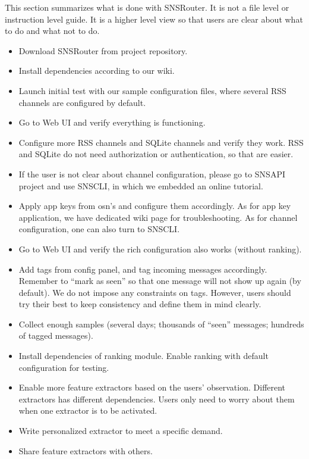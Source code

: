 \documentclass{sig-alternate}
\begin{document}
This section summarizes what is done with SNSRouter. 
It is not a file level or instruction level guide. 
It is a higher level view so that users are clear about 
what to do and what not to do. 

\begin{itemize}
	\item Download SNSRouter from project repository. 
	\item Install dependencies according to our wiki. 
	\item Launch initial test with our sample configuration files, 
		where several RSS channels are configured by default. 
	\item Go to Web UI and verify everything is functioning. 
	\item Configure more RSS channels and SQLite channels 
		and verify they work. 
		RSS and SQLite do not need authorization or authentication, 
		so that are easier. 
	\item If the user is not clear about channel configuration, 
		please go to SNSAPI project and use SNSCLI, 
		in which we embedded an online tutorial. 
	\item Apply app keys from \gls{osn}'s and configure them accordingly. 
		As for app key application, we have dedicated wiki page for troubleshooting. 
		As for channel configuration, one can also turn to SNSCLI. 
	\item Go to Web UI and verify the rich configuration also works
		(without ranking). 
	\item Add tags from config panel, and tag incoming messages accordingly. 
		Remember to ``mark as seen'' so that one message will not show up again (by default). 
		We do not impose any constraints on tags. 
		However, users should try their best to keep consistency 
		and define them in mind clearly. 
	\item Collect enough samples 
		(several days; thousands of ``seen'' messages; hundreds of tagged messages).
	\item Install dependencies of ranking module. 
		Enable ranking with default configuration for testing. 
	\item Enable more feature extractors based on the users' observation. 
		Different extractors has different dependencies. 
		Users only need to worry about them when one extractor is to be activated. 
	\item Write personalized extractor to meet a specific demand. 
	\item Share feature extractors with others. 
\end{itemize}
\end{document}
